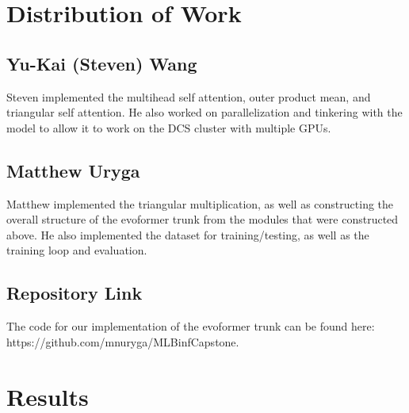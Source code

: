\documentclass[11pt]{article}
\begin{document}
\section{Distribution of Work}
\subsection{Yu-Kai (Steven) Wang}
Steven implemented the multihead self attention, outer product mean, and triangular self attention.  He also worked on parallelization and tinkering with the model to allow it to work on the DCS cluster with multiple GPUs.

\subsection{Matthew Uryga}
Matthew implemented the triangular multiplication, as well as constructing the overall structure of the evoformer trunk from the modules that were constructed above.  He also implemented the dataset for training/testing, as well as the training loop and evaluation.

\subsection{Repository Link}
The code for our implementation of the evoformer trunk can be found here:\\https://github.com/mnuryga/MLBinfCapstone.
\\[4mm]

\section{Results}
\end{document}
